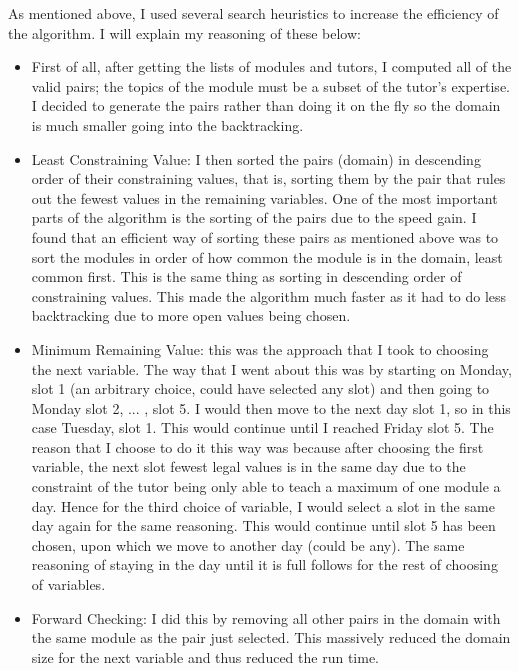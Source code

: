 \documentclass[conference]{IEEEtran}
\begin{document}
As mentioned above, I used several search heuristics to increase the efficiency of the algorithm. I will explain my reasoning of these below: 
\begin{itemize}
\item First of all, after getting the lists of modules and tutors, I computed all of the valid pairs; the topics of the module must be a subset of the tutor's expertise. I decided to generate the pairs rather than doing it on the fly so the domain is much smaller going into the backtracking.
\item Least Constraining Value: I then sorted the pairs (domain) in descending order of their constraining values, that is, sorting them by the pair that rules out the fewest values in the remaining variables. One of the most important parts of the algorithm is the sorting of the pairs due to the speed gain. I found that an efficient way of sorting these pairs as mentioned above was to sort the modules in order of how common the module is in the domain, least common first. This is the same thing as sorting in descending order of constraining values. This made the algorithm much faster as it had to do less backtracking due to more open values being chosen.
\item Minimum Remaining Value: this was the approach that I took to choosing the next variable. The way that I went about this was by starting on Monday, slot 1 (an arbitrary choice, could have selected any slot) and then going to Monday slot 2, ... , slot 5. I would then move to the next day slot 1, so in this case Tuesday, slot 1. This would continue until I reached Friday slot 5. The reason that I choose to do it this way was because after choosing the first variable, the next slot fewest legal values is in the same day due to the constraint of the tutor being only able to teach a maximum of one module a day. Hence for the third choice of variable, I would select a slot in the same day again for the same reasoning. This would continue until slot 5 has been chosen, upon which we move to another day (could be any). The same reasoning of staying in the day until it is full follows for the rest of choosing of variables.
\item Forward Checking: I did this by removing all other pairs in the domain with the same module as the pair just selected. This massively reduced the domain size for the next variable and thus reduced the run time. 

\end{itemize}
\end{document}
